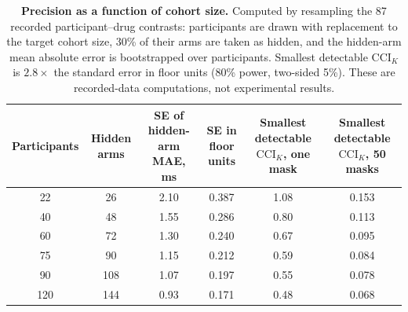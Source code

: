 \documentclass[11pt,a4paper]{article}
\newcommand{\CCI}{\mathrm{CCI}}
\begin{document}
\begin{table}[!htbp]\centering\footnotesize
\caption{\textbf{Precision as a function of cohort size.} Computed by resampling the 87 recorded participant--drug contrasts: participants are drawn with replacement to the target cohort size, 30\% of their arms are taken as hidden, and the hidden-arm mean absolute error is bootstrapped over participants. Smallest detectable $\CCI_K$ is $2.8\times$ the standard error in floor units (80\% power, two-sided 5\%). These are recorded-data computations, not experimental results.}
\label{tab:s32}
\begin{tabularx}{\textwidth}{@{}c c c c c c@{}}\toprule
Participants & Hidden arms & SE of hidden-arm MAE, ms & SE in floor units & Smallest detectable $\CCI_K$, one mask & Smallest detectable $\CCI_K$, 50 masks\\\midrule
22 & 26 & 2.10 & 0.387 & 1.08 & 0.153\\
40 & 48 & 1.55 & 0.286 & 0.80 & 0.113\\
60 & 72 & 1.30 & 0.240 & 0.67 & 0.095\\
75 & 90 & 1.15 & 0.212 & 0.59 & 0.084\\
90 & 108 & 1.07 & 0.197 & 0.55 & 0.078\\
120 & 144 & 0.93 & 0.171 & 0.48 & 0.068\\
\bottomrule\end{tabularx}
\end{table}
\FloatBarrier
\end{document}
